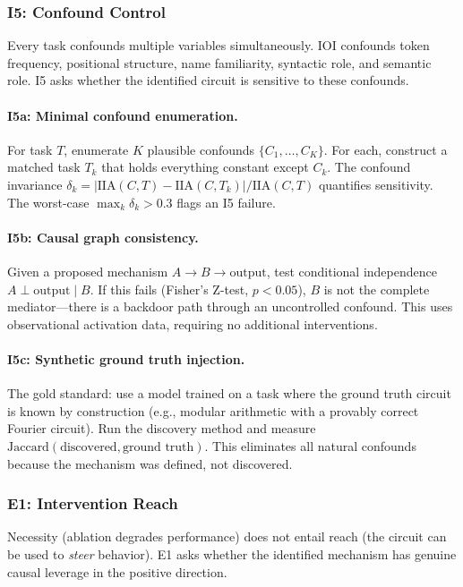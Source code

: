 \documentclass[10pt]{article}
\begin{document}
\subsubsection{I5: Confound Control}

Every task confounds multiple variables simultaneously. IOI confounds token frequency, positional structure, name familiarity, syntactic role, and semantic role. I5 asks whether the identified circuit is sensitive to these confounds.

\paragraph{I5a: Minimal confound enumeration.} For task $T$, enumerate $K$ plausible confounds $\{C_1, \ldots, C_K\}$. For each, construct a matched task $T_k$ that holds everything constant except $C_k$. The confound invariance $\delta_k = |\text{IIA}(C, T) - \text{IIA}(C, T_k)| / \text{IIA}(C, T)$ quantifies sensitivity. The worst-case $\max_k \delta_k > 0.3$ flags an I5 failure.

\paragraph{I5b: Causal graph consistency.} Given a proposed mechanism $A \to B \to \text{output}$, test conditional independence $A \perp \text{output} \mid B$. If this fails (Fisher's Z-test, $p < 0.05$), $B$ is not the complete mediator---there is a backdoor path through an uncontrolled confound. This uses observational activation data, requiring no additional interventions.

\paragraph{I5c: Synthetic ground truth injection.} The gold standard: use a model trained on a task where the ground truth circuit is known by construction (e.g., modular arithmetic with a provably correct Fourier circuit). Run the discovery method and measure $\text{Jaccard}(\text{discovered}, \text{ground truth})$. This eliminates all natural confounds because the mechanism was defined, not discovered.

\subsubsection{E1: Intervention Reach}

Necessity (ablation degrades performance) does not entail reach (the circuit can be used to \emph{steer} behavior). E1 asks whether the identified mechanism has genuine causal leverage in the positive direction.
\end{document}
